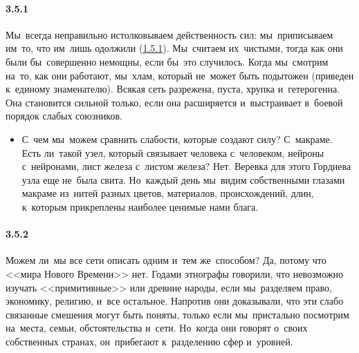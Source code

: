 \paragraph{3.5.1}\hypertarget{par:3.5.1}{} Мы~всегда неправильно истолковываем действенность сил: мы~приписываем им~то, что им~лишь одолжили (\hyperlink{par:1.5.1}{1.5.1}). Мы~считаем их~чистыми, тогда как они были бы~совершенно немощны, если бы~это случилось. Когда мы~смотрим на~то, как они работают, мы~хлам, который не~может быть подытожен (приведен к~единому знаменателю). Всякая сеть разрежена, пуста, хрупка и~гетерогенна. Она становится сильной только, если она расширяется и~выстраивает в~боевой порядок слабых союзников. 
	\begin{itemize}
	\item 
 С~чем мы~можем сравнить слабости, которые создают силу? С~макраме. Есть ли~такой узел, который связывает человека с~человеком, нейроны с~нейронами, лист железа с~листом железа? Нет. Веревка для этого Гордиева узла еще не~была свита. Но~каждый день мы~видим собственными глазами макраме из~нитей разных цветов, материалов, происхождений, длин, к~которым прикреплены наиболее ценимые нами блага.
	\end{itemize}

\paragraph{3.5.2}\hypertarget{par:3.5.2}{} Можем ли~мы все сети описать одним и~тем же~способом? Да, потому что <<мира Нового Времени>> нет.
Годами этнографы говорили, что невозможно изучать <<примитивные>> или древние народы, если мы~разделяем право, экономику, религию, и~все остальное. Напротив они доказывали, что эти слабо связанные смешения могут быть поняты, только если мы~пристально посмотрим на~места, семьи, обстоятельства и~сети. Но~когда они говорят о~своих собственных странах, он~прибегают к~разделению сфер и~уровней.
 

